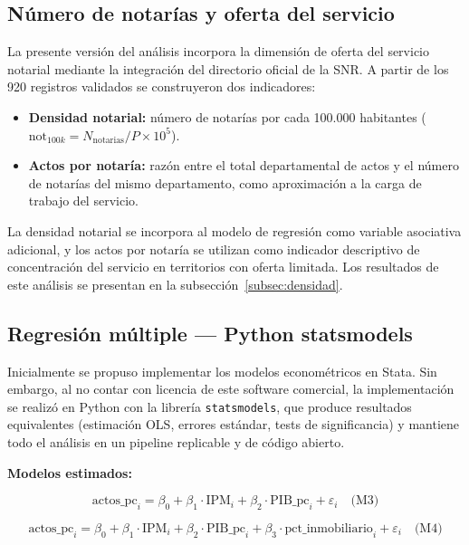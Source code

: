 \documentclass{article}
\begin{document}
\subsection{Número de notarías y oferta del servicio}

La presente versión del análisis incorpora la dimensión de oferta del
servicio notarial mediante la integración del directorio oficial de la
SNR. A partir de los 920 registros validados se construyeron dos
indicadores:

\begin{itemize}
    \item \textbf{Densidad notarial:} número de notarías por cada
    100.000 habitantes ($\text{not}_{100k} = N_{\text{notarias}} / P
    \times 10^{5}$).
    \item \textbf{Actos por notaría:} razón entre el total
    departamental de actos y el número de notarías del mismo
    departamento, como aproximación a la carga de trabajo del servicio.
\end{itemize}

La densidad notarial se incorpora al modelo de regresión como variable
asociativa adicional, y los actos por notaría se utilizan como
indicador descriptivo de concentración del servicio en territorios con
oferta limitada. Los resultados de este análisis se presentan en la
subsección~\ref{subsec:densidad}.

\subsection{Regresión múltiple — Python statsmodels}

Inicialmente se propuso implementar los modelos econométricos en 
Stata. Sin embargo, al no contar con licencia de este software 
comercial, la implementación se realizó en Python con la librería 
\texttt{statsmodels}, que produce resultados equivalentes 
(estimación OLS, errores estándar, tests de significancia) y 
mantiene todo el análisis en un pipeline replicable y de código 
abierto.

\textbf{Modelos estimados:}

\begin{equation}
\text{actos\_pc}_i = \beta_0 +
\beta_1 \cdot \text{IPM}_i +
\beta_2 \cdot \text{PIB\_pc}_i +
\varepsilon_i \quad \text{(M3)}
\end{equation}

\begin{equation}
\text{actos\_pc}_i = \beta_0 +
\beta_1 \cdot \text{IPM}_i +
\beta_2 \cdot \text{PIB\_pc}_i +
\beta_3 \cdot \text{pct\_inmobiliario}_i +
\varepsilon_i \quad \text{(M4)}
\end{equation}
\end{document}
